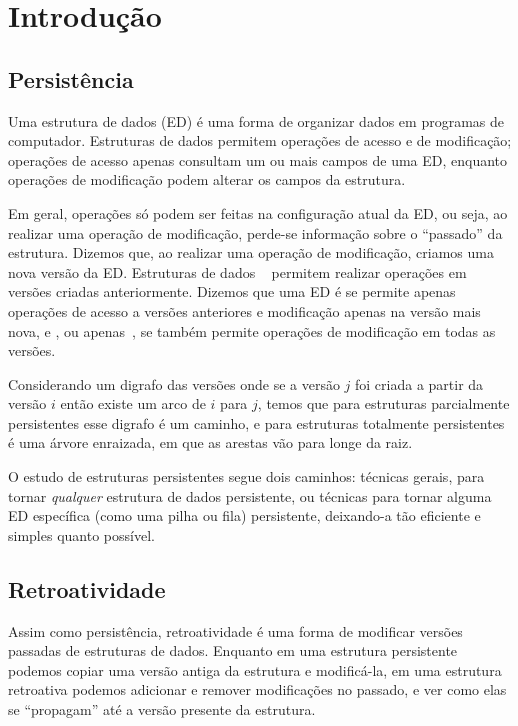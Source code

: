 \documentclass[quali.tex]{subfile}
\begin{document}
\section{Introdução}

\subsection{Persistência}

Uma estrutura de dados (ED) é uma forma de organizar dados em programas de computador. Estruturas de dados permitem operações de acesso e de modificação; operações de acesso apenas consultam um ou mais campos de uma ED, enquanto operações de modificação podem alterar os campos da estrutura.

Em geral, operações só podem ser feitas na configuração atual da ED, ou seja, ao realizar uma operação de modificação, perde-se informação sobre o ``passado'' da estrutura. Dizemos que, ao realizar uma operação de modificação, criamos uma nova versão da ED. Estruturas de dados ~\cite{DriscollSST1989} permitem realizar operações em versões criadas anteriormente. Dizemos que uma ED é  se permite apenas operações de acesso a versões anteriores e modificação apenas na versão mais nova, e , ou apenas~, se também permite operações de modificação em todas as versões.

Considerando um digrafo das versões onde se a versão $j$ foi criada a partir da versão $i$ então existe um arco de $i$ para $j$, temos que para estruturas parcialmente persistentes esse digrafo é um caminho, e para estruturas totalmente persistentes é uma árvore enraizada, em que as arestas vão para longe da raiz.

O estudo de estruturas persistentes segue dois caminhos: técnicas gerais, para tornar \emph{qualquer} estrutura de dados persistente, ou técnicas para tornar alguma ED específica (como uma pilha ou fila) persistente, deixando-a tão eficiente e simples quanto possível.

\subsection{Retroatividade}

Assim como persistência, retroatividade é uma forma de modificar versões passadas de estruturas de dados. Enquanto em uma estrutura persistente podemos copiar uma versão antiga da estrutura e modificá-la, em uma estrutura retroativa podemos adicionar e remover modificações no passado, e ver como elas se ``propagam'' até a versão presente da estrutura.
\end{document}
